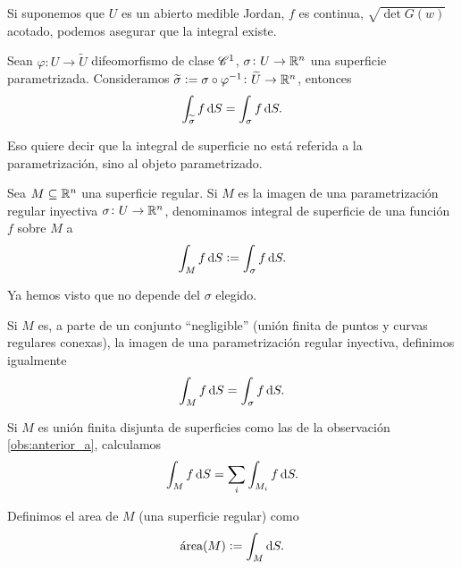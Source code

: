 \begin{obs}
    Si suponemos que $U$ es un abierto medible Jordan, $f$ es continua, $\sqrt{\det G(w)}$ acotado, podemos asegurar que la integral existe.
\end{obs}

\begin{lema}
    Sean $\varphi \colon U \to \widetilde{U}$ difeomorfismo de clase $\mathscr{C}^1$, $\sigma \colon U \to \mathbb{R}^n$ una superficie parametrizada.
    Consideramos $\widetilde{\sigma} := \sigma \circ \varphi^{-1} \colon \widetilde{U} \to \mathbb{R}^n$, entonces
    \[
        \int_{\widetilde{\sigma}} f \dif S = \int_\sigma f \dif S.
    \]
\end{lema}

\begin{obs}
    Eso quiere decir que la integral de superficie no está referida a la parametrización, sino al objeto parametrizado.
\end{obs}

\begin{defi}
    Sea $M \subseteq \mathbb{R}^n$ una superficie regular. Si $M$ es la imagen de una parametrización regular inyectiva $\sigma \colon U \to \mathbb{R}^n$,
    denominamos integral de superficie de una función $f$ sobre $M$ a
    \[
        \int_M f \dif S := \int_\sigma f \dif S.
    \]
\end{defi}

\begin{obs}
    Ya hemos visto que no depende del $\sigma$ elegido.
\end{obs}

\begin{obs}\label{obs:anterior_a}
    Si $M$ es, a parte de un conjunto ``negligible'' (unión finita de puntos y curvas regulares conexas), la imagen de una parametrización regular inyectiva,
    definimos igualmente
    \[
        \int_M f \dif S = \int_\sigma f \dif S.
    \]
\end{obs}

\begin{obs}
    Si $M$ es unión finita disjunta de superficies como las de la observación \ref{obs:anterior_a}, calculamos
    \[
        \int_M f \dif S = \sum_i \int_{M_i} f \dif S.
    \]
\end{obs}

\begin{defi}
    Definimos el area de $M$ (una superficie regular) como
    \[
        \text{\'area}(M) := \int_M \dif S.
    \]
\end{defi}

